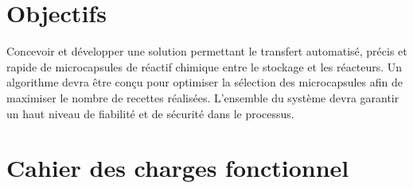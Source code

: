 \section{Objectifs}
Concevoir et développer une solution permettant le transfert automatisé, précis et rapide de microcapsules de réactif chimique entre le 
stockage et les réacteurs. Un algorithme devra être conçu pour optimiser la sélection des microcapsules afin de maximiser le nombre de 
recettes réalisées. L'ensemble du système devra garantir un haut niveau de fiabilité et de sécurité dans le processus.
\section{Cahier des charges fonctionnel}
